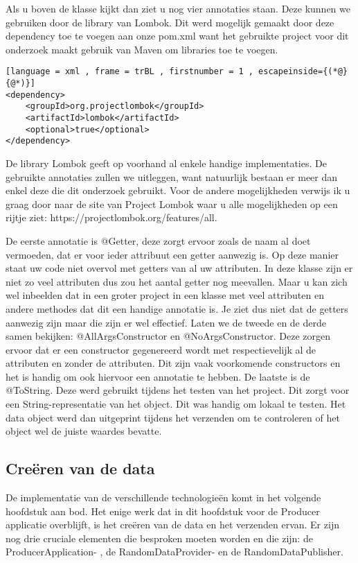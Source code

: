 Als u boven de klasse kijkt dan ziet u nog vier annotaties staan. Deze kunnen we gebruiken door de library van Lombok. Dit werd mogelijk gemaakt door deze dependency toe te voegen aan onze pom.xml want het gebruikte project voor dit onderzoek maakt gebruik van Maven om libraries toe te voegen.

\begin{lstlisting}[language = xml , frame = trBL , firstnumber = 1 , escapeinside={(*@}{@*)}]
<dependency>
    <groupId>org.projectlombok</groupId>
    <artifactId>lombok</artifactId>
    <optional>true</optional>
</dependency>
\end{lstlisting}

De library Lombok geeft op voorhand al enkele handige implementaties. De gebruikte annotaties zullen we uitleggen, want natuurlijk bestaan er meer dan enkel deze die dit onderzoek gebruikt. Voor de andere mogelijkheden verwijs ik u graag door naar de site van Project Lombok waar u alle mogelijkheden op een rijtje ziet: https://projectlombok.org/features/all. 

De eerste annotatie is @Getter, deze zorgt ervoor zoals de naam al doet vermoeden, dat er voor ieder attribuut een getter aanwezig is. Op deze manier staat uw code niet overvol met getters van al uw attributen. In deze klasse zijn er niet zo veel attributen dus zou het aantal getter nog meevallen. Maar u kan zich wel inbeelden dat in een groter project in een klasse met veel attributen en andere methodes dat dit een handige annotatie is. Je ziet dus niet dat de getters aanwezig zijn maar die zijn er wel effectief. Laten we de tweede en de derde samen bekijken: @AllArgsConstructor en @NoArgsConstructor. Deze zorgen ervoor dat er een constructor gegenereerd wordt met respectievelijk al de attributen en zonder de attributen. Dit zijn vaak voorkomende constructors en het is handig om ook hiervoor een annotatie te hebben. De laatste  is de @ToString. Deze werd gebruikt tijdens het testen van het project. Dit zorgt voor een String-representatie van het object. Dit was handig om lokaal te testen. Het data object werd dan uitgeprint tijdens het verzenden om te controleren of het object wel de juiste waardes bevatte.

\subsection{Creëren van de data}
De implementatie van de verschillende technologieën komt in het volgende hoofdstuk aan bod. Het enige werk dat in dit hoofdstuk voor de Producer applicatie overblijft, is het creëren van de data en het verzenden ervan. Er zijn nog drie cruciale elementen die besproken moeten worden en die zijn: de ProducerApplication- , de RandomDataProvider- en de RandomDataPublisher.

